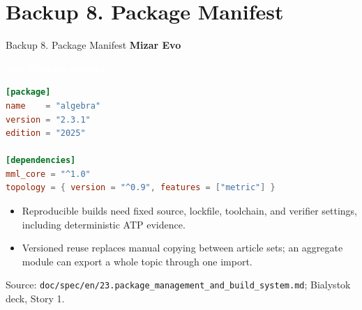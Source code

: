 \documentclass[aspectratio=169,11pt]{beamer}
\newcommand{\statusbadge}[2]{\colorbox{#1}{\textcolor{white}{\strut\scriptsize\sffamily\bfseries #2}}}
\newcommand{\badgeSpec}{\statusbadge{green!35!black}{specification example}}
\begin{document}
\section{Backup 8. Package Manifest}
\begin{frame}[fragile,t]{Backup 8. Package Manifest}
\smallskip
\textbf{Mizar Evo}~\badgeSpec
\begin{lstlisting}[language={toml},basicstyle=\ttfamily\footnotesize]
[package]
name    = "algebra"
version = "2.3.1"
edition = "2025"

[dependencies]
mml_core = "^1.0"
topology = { version = "^0.9", features = ["metric"] }
\end{lstlisting}
\begin{itemize}
\setlength{\itemsep}{1pt}
\setlength{\parsep}{0pt}
\setlength{\parskip}{0pt}
\item Reproducible builds need fixed source, lockfile, toolchain, and verifier settings, including deterministic ATP evidence.
\item Versioned reuse replaces manual copying between article sets; an aggregate module can export a whole topic through one import.
\end{itemize}
Source: \texttt{doc/spec/en/23.package\_management\_and\_build\_system.md}; Bialystok deck, Story 1.

\end{frame}
\end{document}

